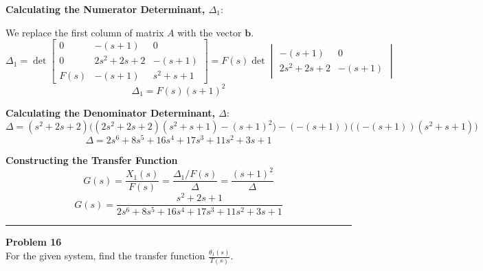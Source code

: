 \documentclass[11pt]{article}
\begin{document}
\vspace{12pt}
\noindent\textbf{Calculating the Numerator Determinant, $\Delta_1$}:
\vspace{12pt}

We replace the first column of matrix $A$ with the vector $\mathbf{b}$.
$$ \Delta_1 = \det
\begin{bmatrix}
0 & -(s+1) & 0 \\
0 & 2s^2 + 2s + 2 & -(s+1) \\
F(s) & -(s+1) & s^2 + s + 1
\end{bmatrix}
= F(s) \det \begin{vmatrix} -(s+1) & 0 \\ 2s^2+2s+2 & -(s+1) \end{vmatrix} $$
$$ \Delta_1 = F(s) (s+1)^2 $$

\vspace{12pt}
\noindent\textbf{Calculating the Denominator Determinant, $\Delta$}:
$$ \Delta = (s^2+2s+2)\big( (2s^2+2s+2)(s^2+s+1) - (s+1)^2 \big) - (-(s+1))\big( (-(s+1))(s^2+s+1) \big) $$
$$ \Delta = 2s^6 + 8s^5 + 16s^4 + 17s^3 + 11s^2 + 3s + 1 $$

\vspace{12pt}
\noindent\textbf{Constructing the Transfer Function}
$$ G(s) = \frac{X_1(s)}{F(s)} = \frac{\Delta_1 / F(s)}{\Delta} = \frac{(s+1)^2}{\Delta} $$
\[
\boxed{
G(s) = \frac{s^2 + 2s + 1}{2s^6 + 8s^5 + 16s^4 + 17s^3 + 11s^2 + 3s + 1} 
}
\]

\newpage
  \setcounter{page}{30}  
\noindent\rule{\textwidth}{1pt}
\noindent\textbf{Problem 16} \hfill 
\\ For the given system, find the transfer function $\frac{\theta_1(s)}{T(s)}$.
\end{document}
